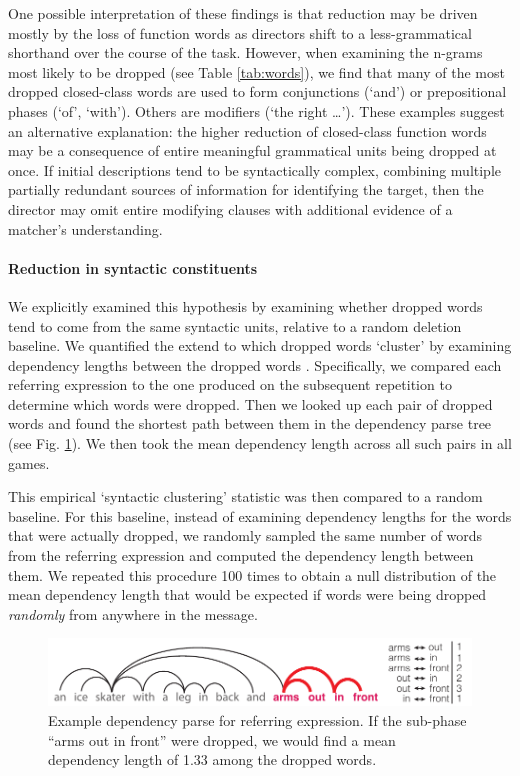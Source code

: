 \documentclass[alpha-refs]{wiley-article}
\begin{document}
One possible interpretation of these findings is that reduction may be driven mostly by the loss of function words as directors shift to a less-grammatical shorthand over the course of the task.
However, when examining the n-grams most likely to be dropped (see Table \ref{tab:words}), we find that many of the most dropped closed-class words are used to form conjunctions (`and') or prepositional phases (`of', `with').
Others are modifiers (`the right \dots'). 
These examples suggest an alternative explanation: the higher reduction of closed-class function words may be a consequence of entire meaningful grammatical units being dropped at once.
If initial descriptions tend to be syntactically complex, combining multiple partially redundant sources of information for identifying the target, then the director may omit entire modifying clauses with additional evidence of a matcher's understanding.

\paragraph{Reduction in syntactic constituents} 
We explicitly examined this hypothesis by examining whether dropped words tend to come from the same syntactic units, relative to a random deletion baseline.
We quantified the extend to which dropped words `cluster' by examining dependency lengths between the dropped words \citep{jurafsky2014speech,futrell2015large}.
Specifically, we compared each referring expression to the one produced on the subsequent repetition to determine which words were dropped.
Then we looked up each pair of dropped words and found the shortest path between them in the dependency parse tree (see Fig. \ref{fig:dependency}).
We then took the mean dependency length across all such pairs in all games.

This empirical `syntactic clustering' statistic was then compared to a random baseline.
For this baseline, instead of examining dependency lengths for the words that were actually dropped, we randomly sampled the same number of words from the referring expression and computed the dependency length between them.
We repeated this procedure 100 times to obtain a null distribution of the mean dependency length that would be expected if words were being dropped \emph{randomly} from anywhere in the message.

\begin{figure}[t!]
\centering
\includegraphics[scale=.8]{dependency.pdf}
\caption{Example dependency parse for referring expression. If the sub-phase ``arms out in front'' were dropped, we would find a mean dependency length of 1.33 among the dropped words.} 
\label{fig:dependency}
\end{figure}
\end{document}
